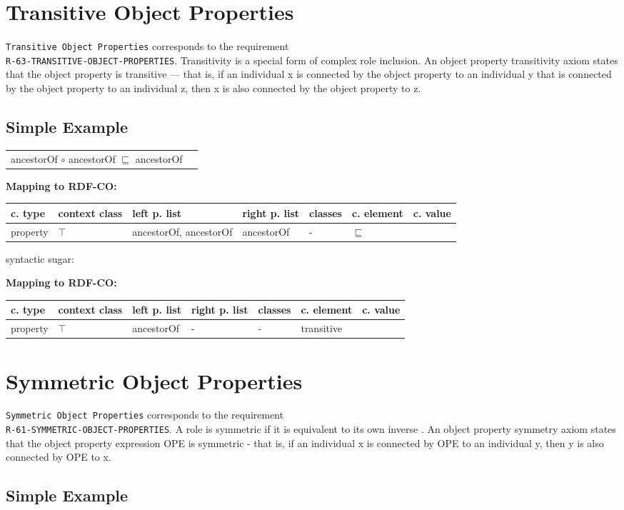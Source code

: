 \documentclass{llncs}
\newcommand{\ms}[1]{\texttt{#1}}
\newenvironment{gcotable}{
  \scriptsize
  \sffamily
  \vspace{0cm}
	\begin{center}
	\textbf{\vspace{0.4cm}Mapping to RDF-CO:} \\
  \begin{tabular}{l|l|l|l|l|l|l}
	\hline
  \textbf{c. type} & \textbf{context class} & \textbf{left p. list} & \textbf{right p. list} & \textbf{classes} & \textbf{c. element} & \textbf{c. value} \\
  \hline

}{
  \hline
  \end{tabular}
	\end{center}
}
\newenvironment{DL}{
  \vspace{0cm}
	\begin{center}
  \begin{tabular}{r l}

}{
  \end{tabular}
	\end{center}
}
\begin{document}
\section{Transitive Object Properties}

\ms{Transitive Object Properties} corresponds to the requirement \\
\ms{R-63-TRANSITIVE-OBJECT-PROPERTIES}.
Transitivity is a special form of complex role inclusion.
An object property transitivity axiom states that the object property is transitive — that is, if an individual x is connected by the object property to an individual y that is connected by the object property to an individual z, then x is also connected by the object property to z.

\subsection{Simple Example}

\begin{DL}
ancestorOf $\circ$ ancestorOf $\sqsubseteq$ ancestorOf
\end{DL}

\begin{gcotable}
property & $\top$ & ancestorOf, ancestorOf & ancestorOf & - & $\sqsubseteq$ \\
\end{gcotable}

syntactic sugar:

\begin{gcotable}
property & $\top$ & ancestorOf & - & - & transitive \\
\end{gcotable}

\section{Symmetric Object Properties}

\ms{Symmetric Object Properties} corresponds to the requirement \\
\ms{R-61-SYMMETRIC-OBJECT-PROPERTIES}.
A role is symmetric if it is equivalent to its own inverse \cite{Kroetzsch2012}.
An object property symmetry axiom states that the object property expression OPE is symmetric - that is, if an individual x is connected by OPE to an individual y, then y is also connected by OPE to x. 	

\subsection{Simple Example}
\end{document}
